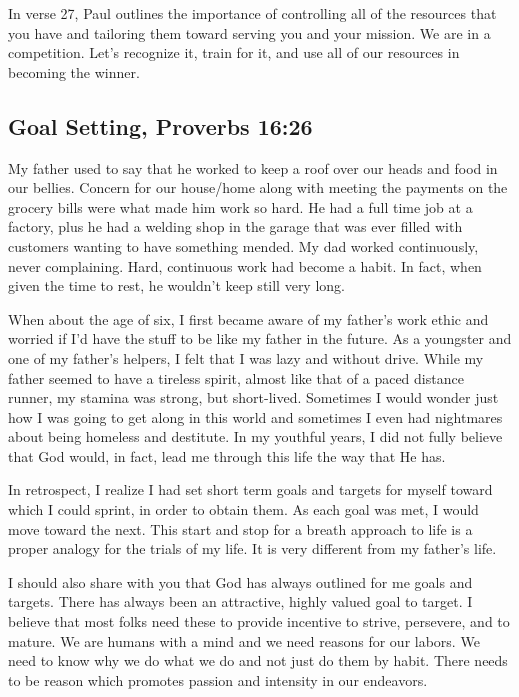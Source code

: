 \documentclass[12pt]{memoir}
\begin{document}
In verse 27, Paul outlines the importance of controlling all of the
resources that you have and tailoring them toward serving you and your
mission. We are in a competition. Let's recognize it, train for it,
and use all of our resources in becoming the winner.

\subsection[Goal Setting]{Goal Setting, Proverbs 16:26}

My father used to say that he worked to keep a roof over our heads
and food in our bellies. Concern for our house\slash{}home along with meeting
the payments on the grocery bills were what made him work so hard.
He had a full time job at a factory, plus he had a welding shop
in the garage that was ever filled with customers wanting to have
something mended. My dad worked continuously, never complaining. Hard,
continuous work had become a habit. In fact, when given the time to
rest, he wouldn't keep still very long. 

When about the age of six, I first became aware of my father's work
ethic and worried if I'd have the stuff to be like my father
in the future. As a youngster and one of my father's helpers, I felt
that I was lazy and without drive. While my father seemed to have
a tireless spirit, almost like that of a paced distance runner, my
stamina was strong, but short-lived. Sometimes I would wonder just
how I was going to get along in this world and sometimes I even had
nightmares about being homeless and destitute. In my youthful years,
I did not fully believe that God would, in fact, lead me through this
life the way that He has.

In retrospect, I realize I had set short term goals and targets for
myself toward which I could sprint, in order to obtain them. As each goal was met, I would move toward the next. This start and stop for a breath approach to life is a proper analogy for the trials of my life. It is very different from my father's life. 

I should also share with you that God has always outlined for me
goals and targets. There has always been an attractive, highly valued
goal to target. I believe that most folks need these to provide incentive
to strive, persevere, and to mature. We are humans with a mind and
we need reasons for our labors. We need to know why we do what we
do and not just do them by habit. There needs to be reason which
promotes passion and intensity in our endeavors.
\end{document}
